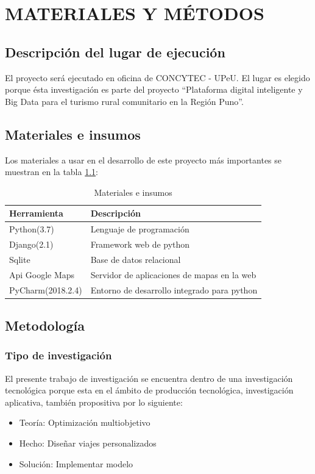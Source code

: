 \chapter{MATERIALES Y MÉTODOS}
\section{Descripción del lugar de ejecución}
El proyecto será ejecutado en oficina de CONCYTEC - UPeU. El lugar es elegido porque ésta investigación es parte del proyecto “Plataforma digital inteligente y Big Data para el turismo rural comunitario en la Región Puno”.
\section{Materiales e insumos}
Los materiales a usar en el desarrollo de este proyecto más importantes se muestran en la tabla \ref{tab:materiales}:
\begin{table}[ht]
\caption{Materiales e insumos}
\label{tab:materiales}
\begin{tabular}{ll} \hline
\textbf{Herramienta} &\textbf{Descripción}\\ \hline
 Python(3.7) & Lenguaje de programación \\
 Django(2.1) & Framework web de python \\
 Sqlite & Base de datos relacional \\
 Api Google Maps & Servidor de aplicaciones de mapas en la web \\ 
 PyCharm(2018.2.4) & Entorno de desarrollo integrado para python \\
 \hline
\end{tabular}
\end{table}

\section{Metodología}
\subsection{Tipo de investigación}
El presente trabajo de investigación se encuentra dentro de una investigación tecnológica porque esta en el ámbito de producción tecnológica, investigación aplicativa, también propositiva por lo siguiente:
\begin{itemize}[noitemsep]
    \item Teoría: Optimización multiobjetivo
    \item Hecho: Diseñar viajes personalizados
    \item Solución: Implementar modelo
\end{itemize}

